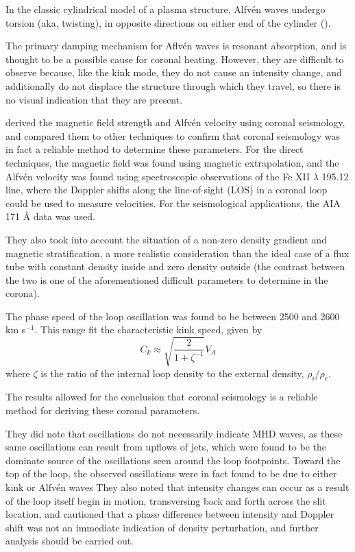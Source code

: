 \documentclass[preprint2]{aastex}
\begin{document}
In the classic cylindrical model of a plasma structure,
Alfv\'en waves undergo torsion (aka, twisting), in opposite directions on
either end of the cylinder (\cite{Nak}).

The primary damping mechanism for Aflv\'en waves is resonant absorption,
and is thought to be a possible cause for coronal heating.
However, they are difficult to observe because, like the kink mode,
they do not cause an intensity change, and additionally do not displace
the structure through which they travel, so there is no visual indication
that they are present.

\cite{tor_1} derived the magnetic field strength and Alfv\'en velocity
using coronal seismology, and compared them to other techniques to
confirm that coronal seismology was in fact a reliable method to determine
these parameters. For the direct techniques,
the magnetic field was found using magnetic extrapolation,
and the Alfv\'en velocity was found
using spectroscopic observations of the Fe
{\footnotesize XII} $\lambda$ 195.12 line, where the Doppler shifts
along the line-of-sight (LOS) in a coronal loop could be used to
measure velocities. For the seismological applications, the AIA
171 \AA{} data was used.

They also took into account the situation of a non-zero density
gradient and magnetic stratification, a more realistic consideration
than the ideal case of a flux tube with constant density inside
and zero density outside (the contrast between the two is one of
the aforementioned difficult parameters to determine in the corona).

The phase speed of the loop oscillation was found to be between
2500 and 2600 km s$^{-1}$. This range fit the characteristic kink
speed, given by
\begin{equation}\label{kink_speed}
    C_k \approx \sqrt{\frac{2}{1+\zeta^{-1}}}V_A
\end{equation}
where $\zeta$ is the ratio of the internal loop density to the external
density, $\rho_i/\rho_e$.

The results allowed for the conclusion that coronal seismology is a
reliable method for deriving these coronal parameters.

They did note that oscillations do not necessarily indicate MHD waves,
as these same oscillations can result from upflows of jets, which were
found to be the dominate source of the oscillations seen around the loop
footpoints. Toward the top of the loop, the observed oscillations were
in fact found to be due to either kink or Alfv\'en waves
They also noted that intensity changes can occur as
a result of the loop itself begin in motion, transversing back and
forth across the slit location, and cautioned that a phase difference
between intensity and Doppler shift was not an immediate indication
of density perturbation, and further analysis should be carried out.
\end{document}
